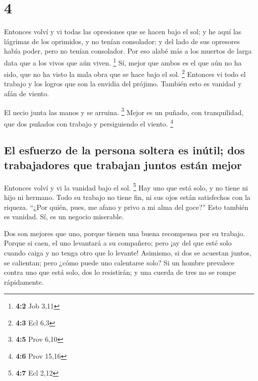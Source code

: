 \hypertarget{section-3}{%
\section{4}\label{section-3}}

 Entonces volví y vi todas las opresiones que se hacen
bajo el sol; y he aquí las lágrimas de los oprimidos, y no tenían
consolador; y del lado de sus opresores había poder, pero no tenían
consolador.  Por eso alabé más a los muertos de larga data
que a los vivos que aún viven. \footnote{\textbf{4:2} Job 3,11}
 Sí, mejor que ambos es el que aún no ha sido, que no ha
visto la mala obra que se hace bajo el sol. \footnote{\textbf{4:3} Ecl
  6,3}  Entonces vi todo el trabajo y los logros que son
la envidia del prójimo. También esto es vanidad y afán de viento.

 El necio junta las manos y se arruina. \footnote{\textbf{4:5}
  Prov 6,10}  Mejor es un puñado, con tranquilidad, que
dos puñados con trabajo y persiguiendo el viento. \footnote{\textbf{4:6}
  Prov 15,16}

\hypertarget{el-esfuerzo-de-la-persona-soltera-es-inuxfatil-dos-trabajadores-que-trabajan-juntos-estuxe1n-mejor}{%
\subsection{El esfuerzo de la persona soltera es inútil; dos
trabajadores que trabajan juntos están
mejor}\label{el-esfuerzo-de-la-persona-soltera-es-inuxfatil-dos-trabajadores-que-trabajan-juntos-estuxe1n-mejor}}

 Entonces volví y vi la vanidad bajo el sol. \footnote{\textbf{4:7}
  Ecl 2,12}  Hay uno que está solo, y no tiene ni hijo ni
hermano. Todo su trabajo no tiene fin, ni sus ojos están satisfechos con
la riqueza. ``¿Por quién, pues, me afano y privo a mi alma del goce?''
Esto también es vanidad. Sí, es un negocio miserable.

 Dos son mejores que uno, porque tienen una buena
recompensa por su trabajo.  Porque si caen, el uno
levantará a su compañero; pero ¡ay del que esté solo cuando caiga y no
tenga otro que lo levante!  Asimismo, si dos se acuestan
juntos, se calientan; pero ¿cómo puede uno calentarse solo?
 Si un hombre prevalece contra uno que está solo, dos lo
resistirán; y una cuerda de tres no se rompe rápidamente.

